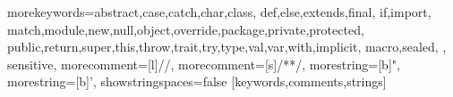 \newcommand{\FP}{{\emph{function passing}}}

\newcommand{\ie}{{\em i.e.,~}}
\newcommand{\eg}{{\em e.g.,~}}

\newcommand{\comment}[1]{}
\newcommand{\fixme}[1]{{\color{gray}\itshape#1}}

%
{morekeywords={abstract,case,catch,char,class,%
    def,else,extends,final,%
    if,import,%
    match,module,new,null,object,override,package,private,protected,%
    public,return,super,this,throw,trait,try,type,val,var,with,implicit,%
    macro,sealed,%
  },%
  sensitive,%
  morecomment=[l]//,%
  morecomment=[s]{/*}{*/},%
  morestring=[b]",%
  morestring=[b]',%
  showstringspaces=false%
}[keywords,comments,strings]%


\newcommand{\gap}{\quad\quad}

\newcommand{\ba}{\begin{array}}
\newcommand{\ea}{\end{array}}

\newcommand{\seq}[1]{\overline{#1}}

\newcommand{\Req}[3]{\text{Req}_s(#1, #2, #3)}
\newcommand{\Res}[3]{\text{Res}_s(#1, #2, #3)}
\newcommand{\ReqF}[2]{\text{Req}_{\iota}(#1, #2)}
\newcommand{\ReqE}[3]{\text{Req}_f(#1, #2, #3)}
\newcommand{\Per}[3]{\text{Persist}(#1, #2, #3)}

\newcommand{\None}{\text{None}}
\newcommand{\Some}[1]{\text{Some}(#1)}

\newcommand{\Val}[1]{\text{Val}(#1)}
\newcommand{\Fwd}[1]{\text{Fwd}(#1)}

\newcommand{\consume}[3]{\text{consume}(#1, #2, #3)}

\newcommand{\note}[1]{{\bf $\clubsuit$ #1 $\spadesuit$}}

\newcommand{\text}[1]{\textrm{#1}}

